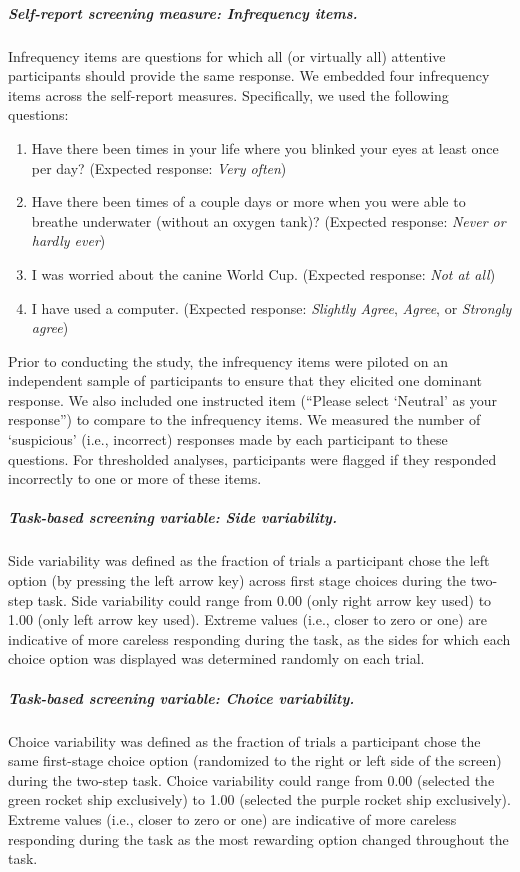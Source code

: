 \documentclass[a4paper,notitlepage,12pt]{article}
\begin{document}
\begin{refsection}[supp]
\subparagraph{Self-report screening measure: Infrequency items.} Infrequency items are questions for which all (or virtually all) attentive participants should provide the same response. We embedded four infrequency items across the self-report measures. Specifically, we used the following questions:

\begin{enumerate}
  \item Have there been times in your life where you blinked your eyes at least once per day? (Expected response: \textit{Very often})
  \item Have there been times of a couple days or more when you were able to breathe underwater (without an oxygen tank)? (Expected response: \textit{Never or hardly ever})
  \item I was worried about the canine World Cup. (Expected response: \textit{Not at all})
  \item I have used a computer. (Expected response: \textit{Slightly Agree}, \textit{Agree}, or \textit{Strongly agree})
\end{enumerate}

Prior to conducting the study, the infrequency items were piloted on an independent sample of participants to ensure that they elicited one dominant response. We also included one instructed item (``Please select `Neutral' as your response'') to compare to the infrequency items. We measured the number of `suspicious' (i.e., incorrect) responses made by each participant to these questions. For thresholded analyses, participants were flagged if they responded incorrectly to one or more of these items. 

\subparagraph{Task-based screening variable: Side variability.} Side variability was defined as the fraction of trials a participant chose the left option (by pressing the left arrow key) across first stage choices during the two-step task. Side variability could range from 0.00 (only right arrow key used) to 1.00 (only left arrow key used). Extreme values (i.e., closer to zero or one) are indicative of more careless responding during the task, as the sides for which each choice option was displayed was determined randomly on each trial.  

\subparagraph{Task-based screening variable: Choice variability.} Choice variability was defined as the fraction of trials a participant chose the same first-stage choice option (randomized to the right or left side of the screen) during the two-step task. Choice variability could range from 0.00 (selected the green rocket ship exclusively) to 1.00 (selected the purple rocket ship exclusively). Extreme values (i.e., closer to zero or one) are indicative of more careless responding during the task as the most rewarding option changed throughout the task.  


\end{refsection}
\end{document}
